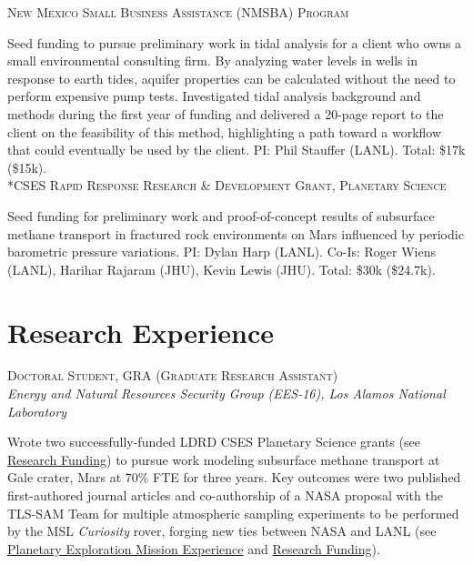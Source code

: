 \documentclass[11pt, letterpaper]{article}
\newcommand{\years}[1]{\marginnote{\scriptsize #1}}
\begin{document}
\years{2020}\textsc{New Mexico Small Business Assistance (NMSBA) Program}

	Seed funding to pursue preliminary work in tidal analysis for a client who
	owns a small environmental consulting firm. By analyzing water levels in
	wells in response to earth tides, aquifer properties can be calculated
	without the need to perform expensive pump tests.  Investigated tidal
	analysis background and methods during the first year of funding and
	delivered a 20-page report to the client on the feasibility of this method,
	highlighting a path toward a workflow that could eventually be used by the
	client.   
	PI: Phil Stauffer (LANL). Total: \$17k (\$15k). \\

\years{2020}\textsc{*CSES Rapid Response Research \& Development Grant, Planetary
Science}

	Seed funding for preliminary work and proof-of-concept results of
	subsurface methane transport in fractured rock environments on Mars
	influenced by periodic barometric pressure variations.
	PI: Dylan Harp (LANL). Co-Is: Roger Wiens (LANL), Harihar Rajaram (JHU),
	Kevin Lewis (JHU). Total: \$30k (\$24.7k). %


\section*{Research Experience}
\setlength{\parindent}{14pt}
\years{2020 - pres.}\textsc{Doctoral Student, GRA (Graduate Research Assistant)}\\
\textit{Energy and Natural Resources Security Group (EES-16), Los Alamos National Laboratory}

    \vspace{3pt} \noindent  
    Wrote two successfully-funded LDRD CSES Planetary Science grants (see
    \hyperref[sec:funding]{Research Funding}) to pursue work modeling
    subsurface methane transport at Gale crater, Mars at 70\% FTE for three
    years. Key outcomes were two published first-authored journal articles and
    co-authorship of a NASA proposal with the TLS-SAM Team for multiple
    atmospheric sampling experiments to be performed by the MSL
    \textit{Curiosity} rover, forging new ties between NASA and LANL (see
    \hyperref[sec:missions]{Planetary Exploration Mission Experience} and
    \hyperref[sec:funding]{Research Funding}).
\end{document}
